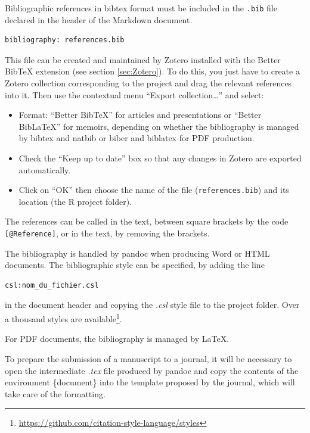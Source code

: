 \documentclass[
  12pt,
  american,
  a4paper,
  extrafontsizes,onecolumn,openright
  ]{memoir}
\providecommand{\tightlist}{%
  \setlength{\itemsep}{0pt}\setlength{\parskip}{0pt}}
\begin{document}
Bibliographic references in bibtex format must be included in the \texttt{.bib} file declared in the header of the Markdown document.

\begin{verbatim}
bibliography: references.bib
\end{verbatim}

This file can be created and maintained by Zotero installed with the Better BibTeX extension (see section \ref{sec:Zotero}).
To do this, you just have to create a Zotero collection corresponding to the project and drag the relevant references into it.
Then use the contextual menu \enquote{Export collection\ldots{}} and select:

\begin{itemize}
\tightlist
\item
  Format: \enquote{Better BibTeX} for articles and presentations or \enquote{Better BibLaTeX} for memoirs, depending on whether the bibliography is managed by bibtex and natbib or biber and biblatex for PDF production.
\item
  Check the \enquote{Keep up to date} box so that any changes in Zotero are exported automatically.
\item
  Click on \enquote{OK} then choose the name of the file (\texttt{references.bib}) and its location (the R project folder).
\end{itemize}

The references can be called in the text, between square brackets by the code \texttt{{[}@Reference{]}}, or in the text, by removing the brackets.

The bibliography is handled by pandoc when producing Word or HTML documents.
The bibliographic style can be specified, by adding the line

\begin{verbatim}
csl:nom_du_fichier.csl
\end{verbatim}

in the document header and copying the \emph{.csl} style file to the project folder.
Over a thousand styles are available\footnote{\url{https://github.com/citation-style-language/styles}}.

For PDF documents, the bibliography is managed by LaTeX.

To prepare the submission of a manuscript to a journal, it will be necessary to open the intermediate \emph{.tex} file produced by pandoc and copy the contents of the environment \{document\} into the template proposed by the journal, which will take care of the formatting.
\end{document}
